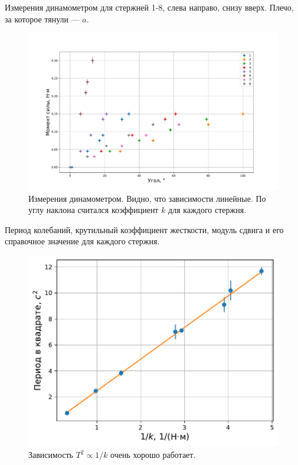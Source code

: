 \documentclass[a4paper, 12pt]{article}
\begin{document}
\begin{table}[!htbp]
\label{tab:force-angle}
\caption{
    Измерения динамометром для стержней 1-8, слева направо, снизу вверх.
    Плечо, за которое тянули --- $a$.
}








\end{table}

\begin{figure}[h]
\label{fig:torque-angle-plot}
\caption{
    Измерения динамометром. Видно, что зависимости линейные.
    По углу наклона считался коэффициент $k$ для каждого стержня.
}
\begin{center}
\includegraphics[width=1\linewidth]{torque-angle-plot.pdf}
\end{center}
\end{figure}

\begin{table}[!htbp]
\label{tab:main}
\caption{Период колебаний, крутильный коэффициент жесткости, модуль сдвига и его справочное значение для каждого стержня.}

\end{table}

\begin{figure}[h]
\caption{Зависимость $T^2 \propto 1/k$ очень хорошо работает.}
\begin{center}
\includegraphics[width=0.8\linewidth]{periods_vs_tors_coefs_plot.pdf}
\end{center}
\end{figure}


\end{document}
